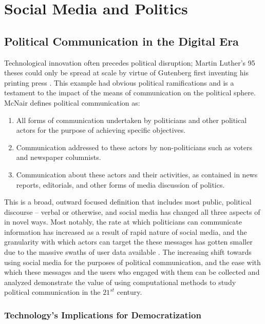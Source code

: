 \chapter{Social Media and Politics}\label{ch:SMandPolitics}

\section{Political Communication in the Digital Era}

Technological innovation often precedes political disruption; Martin Luther’s 95
theses could only be spread at scale by virtue of Gutenberg first inventing his
printing press \cite{gardels2019renovating}. This example had obvious political
ramifications and is a testament to the impact of the means of communication on
the political sphere. McNair defines political communication as:

\begin{enumerate}    
    \item All forms of communication undertaken by politicians and other
    political actors for the purpose of achieving specific objectives.
    \item Communication addressed to these actors by non-politicians such as
    voters and newspaper columnists.
    \item Communication about these actors and their activities, as contained in news reports, editorials, and other forms of media discussion of politics. \cite{mcnair2017introduction}
\end{enumerate} 

This is a broad, outward focused definition that includes most public, political
discourse -- verbal or otherwise, and social media has changed all three aspects
of in novel ways. Most notably, the rate at which politicians can communicate
information has increased as a result of rapid nature of social media, and the
granularity with which actors can target the these messages has gotten smaller
due to the massive swaths of user data available \cite{nickerson2014political}.
The increasing shift towards using social media for the purposes of political
communication, and the ease with which these messages and the users who engaged
with them can be collected and analyzed demonstrate the value of using
computational methods to study political communication in the $21^{st}$ century.

\subsection{Technology's Implications for Democratization}


